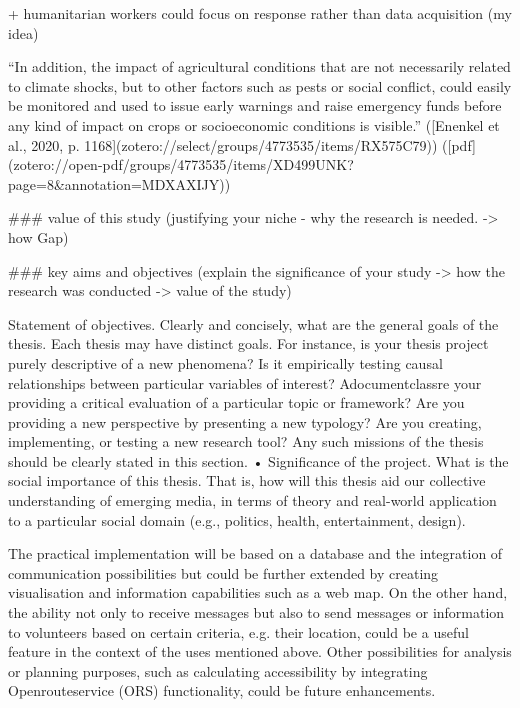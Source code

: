 + humanitarian workers could focus on response rather than data acquisition (my idea)

“In addition, the impact of agricultural conditions that are not necessarily related to climate shocks, but to other factors such as pests or social conflict, could easily be monitored and used to issue early warnings and raise emergency funds before any kind of impact on crops or socioeconomic conditions is visible.” ([Enenkel et al., 2020, p. 1168](zotero://select/groups/4773535/items/RX575C79)) ([pdf](zotero://open-pdf/groups/4773535/items/XD499UNK?page=8&annotation=MDXAXIJY))


\#\#\# value of this study
(justifying your niche - why the research is needed. -> how Gap)

\#\#\# key aims and objectives
(explain the significance of your study -> how the research was conducted -> value of the study)

Statement of objectives. Clearly and concisely, what are the general goals of the
thesis. Each thesis may have distinct goals. For instance, is your thesis project purely
descriptive of a new phenomena? Is it empirically testing causal relationships
between particular variables of interest? Adocumentclassre your providing a critical evaluation of a
particular topic or framework? Are you providing a new perspective by presenting a
new typology? Are you creating, implementing, or testing a new research tool? Any
such missions of the thesis should be clearly stated in this section.
• Significance of the project. What is the social importance of this thesis. That is, how
will this thesis aid our collective understanding of emerging media, in terms of
theory and real-world application to a particular social domain (e.g., politics, health,
entertainment, design).




The practical implementation will be based on a database and the integration of communication possibilities but could be further extended by creating visualisation and information capabilities such as a web map. On the other hand, the ability not only to receive messages but also to send messages or information to volunteers based on certain criteria, e.g. their location, could be a useful feature in the context of the uses mentioned above. Other possibilities for analysis or planning purposes, such as calculating accessibility by integrating Openrouteservice (ORS) functionality, could be future enhancements.




